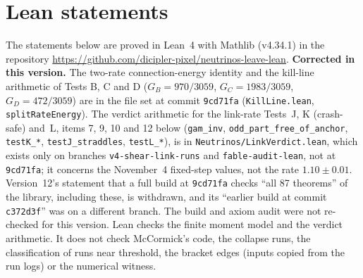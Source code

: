 \documentclass[11pt]{article}
\begin{document}
\section{Lean statements}
\sloppy
The statements below are proved in Lean~4 with Mathlib (v4.34.1) in the repository \url{https://github.com/dicipler-pixel/neutrinos-leave-lean}. \textbf{Corrected in this version.} The two-rate connection-energy identity and the kill-line arithmetic of Tests B, C and D ($G_B=970/3059$, $G_C=1983/3059$, $G_D=472/3059$) are in the file set at commit \texttt{9cd71fa} (\texttt{KillLine.lean}, \texttt{splitRateEnergy}). The verdict arithmetic for the link-rate Tests~J, K (crash-safe) and~L, items 7, 9, 10 and 12 below (\texttt{gam\_inv}, \texttt{odd\_part\_free\_of\_anchor}, \texttt{testK\_*}, \texttt{testJ\_straddles}, \texttt{testL\_*}), is in \texttt{Neutrinos/LinkVerdict.lean}, which exists only on branches \texttt{v4-shear-link-runs} and \texttt{fable-audit-lean}, not at \texttt{9cd71fa}; it concerns the November~4 fixed-step values, not the rate $1.10\pm0.01$. Version~12's statement that a full build at \texttt{9cd71fa} checks ``all 87 theorems'' of the library, including these, is withdrawn, and its ``earlier build at commit \texttt{c372d3f}'' was on a different branch. The build and axiom audit were not re-checked for this version. Lean checks the finite moment model and the verdict arithmetic. It does not check McCormick's code, the collapse runs, the classification of runs near threshold, the bracket edges (inputs copied from the run logs) or the numerical witness.
\end{document}

